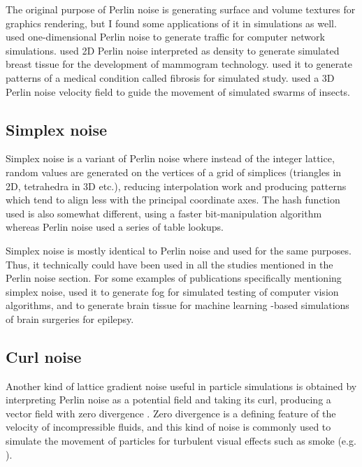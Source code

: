 \documentclass{article}
\begin{document}
The original purpose of Perlin noise is generating surface and volume textures
for graphics rendering, but I found some applications of it in simulations as
well. \textcite{prieto_traffic_2012} used one-dimensional Perlin noise to
generate traffic for computer network simulations.
\textcite{barufaldi_computational_2021} used 2D Perlin noise interpreted as
density to generate simulated breast tissue for the development of mammogram
technology. \textcite{jakes_perlin_2019} used it to generate patterns of a
medical condition called fibrosis for simulated study.
\textcite{wang_inherent_2014} used a 3D Perlin noise velocity field to guide
the movement of simulated swarms of insects.

\subsection*{Simplex noise}

Simplex noise \parencite{perlin_real-time_2002} is a variant of Perlin noise
where instead of the integer lattice, random values are generated on the
vertices of a grid of simplices (triangles in 2D, tetrahedra in 3D etc.),
reducing interpolation work and producing patterns which tend to align less
with the principal coordinate axes. The hash function used is also somewhat
different, using a faster bit-manipulation algorithm whereas Perlin noise used
a series of table lookups.

Simplex noise is mostly identical to Perlin noise and used for the same
purposes. Thus, it technically could have been used in all the studies
mentioned in the Perlin noise section. For some examples of publications
specifically mentioning simplex noise, \textcite{kahraman_influence_2017} used
it to generate fog for simulated testing of computer vision algorithms, and
\textcite{perez-garcia_simulation_2020} to generate brain tissue for machine
learning -based simulations of brain surgeries for epilepsy.

\subsection*{Curl noise}

Another kind of lattice gradient noise useful in particle simulations is
obtained by interpreting Perlin noise as a potential field and taking its curl,
producing a vector field with zero divergence
\parencite{bridson_curl-noise_2007}. Zero divergence is a defining feature of
the velocity of incompressible fluids, and this kind of noise is commonly used
to simulate the movement of particles for turbulent visual effects such as
smoke (e.g. \textcite{schechter_evolving_2008}).
\end{document}
